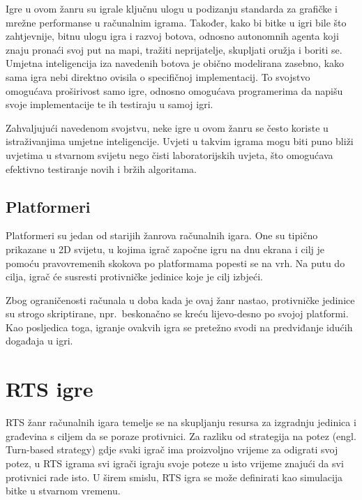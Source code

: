 \documentclass[times, utf8, zavrsni, numeric]{fer}
\begin{document}
\par Igre u ovom žanru su igrale ključnu ulogu u podizanju standarda za grafičke i mrežne performanse u računalnim igrama.
Također, kako bi bitke u igri bile što zahtjevnije, bitnu ulogu igra i razvoj botova, odnosno autonomnih agenta koji znaju pronaći svoj put na mapi, tražiti neprijatelje, skupljati oružja i boriti se.
Umjetna inteligencija iza navedenih botova je obično modelirana zasebno, kako sama igra nebi direktno ovisila o specifičnoj implementacij.
To svojstvo omogućava proširivost samo igre, odnosno omogućava programerima da napišu svoje implementacije te ih testiraju u samoj igri.

\par Zahvaljujući navedenom svojstvu, neke igre u ovom žanru se često koriste u istraživanjima umjetne inteligencije.
Uvjeti u takvim igrama mogu biti puno bliži uvjetima u stvarnom svijetu nego čisti laboratorijskih uvjeta, što omogućava efektivno testiranje novih i bržih algoritama.

\section{Platformeri}

\par Platformeri su jedan od starijih žanrova računalnih igara.
One su tipično prikazane u 2D svijetu, u kojima igrač započne igru na dnu ekrana i cilj je pomoću pravovremenih skokova po platformama popesti se na vrh.
Na putu do cilja, igrač će susresti protivničke jedinice koje je cilj izbjeći.

\par Zbog ograničenosti računala u doba kada je ovaj žanr nastao, protivničke jedinice su strogo skriptirane, npr.\ beskonačno se kreću lijevo-desno po svojoj platformi.
Kao posljedica toga, igranje ovakvih igra se pretežno svodi na predviđanje idućih događaja u igri.

\chapter{RTS igre}\label{ch:rtsGames}
\par RTS žanr računalnih igara temelje se na skupljanju resursa za izgradnju jedinica i građevina s ciljem da se poraze protivnici. 
Za razliku od strategija na potez (engl. Turn-based strategy) gdje svaki igrač ima proizvoljno vrijeme za odigrati svoj potez, u RTS igrama svi igrači igraju svoje poteze u isto vrijeme znajući da svi protivnici rade isto. 
U širem smislu, RTS igra se može definirati kao simulacija bitke u stvarnom vremenu.
\end{document}
